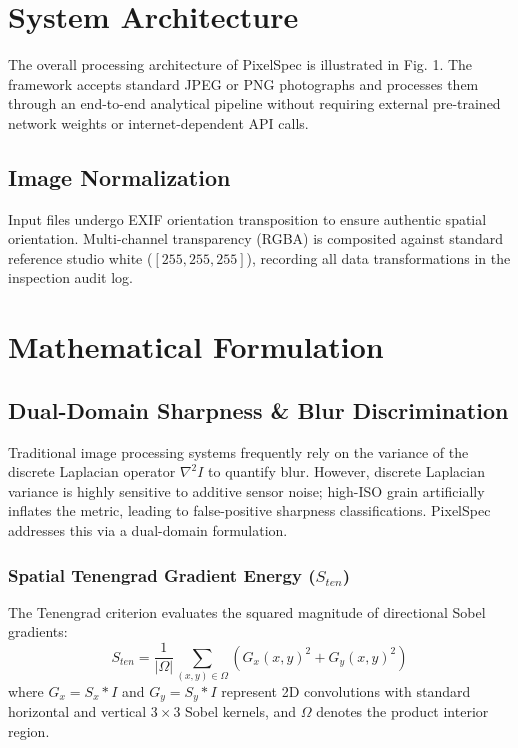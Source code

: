 \documentclass[conference]{IEEEtran}
\begin{document}
\section{System Architecture}
The overall processing architecture of PixelSpec is illustrated in Fig. 1. The framework accepts standard JPEG or PNG photographs and processes them through an end-to-end analytical pipeline without requiring external pre-trained network weights or internet-dependent API calls.

\subsection{Image Normalization}
Input files undergo EXIF orientation transposition to ensure authentic spatial orientation. Multi-channel transparency (RGBA) is composited against standard reference studio white ($[255, 255, 255]$), recording all data transformations in the inspection audit log.

\section{Mathematical Formulation}

\subsection{Dual-Domain Sharpness & Blur Discrimination}
Traditional image processing systems frequently rely on the variance of the discrete Laplacian operator $\nabla^2 I$ to quantify blur. However, discrete Laplacian variance is highly sensitive to additive sensor noise; high-ISO grain artificially inflates the metric, leading to false-positive sharpness classifications. PixelSpec addresses this via a dual-domain formulation.

\subsubsection{Spatial Tenengrad Gradient Energy ($S_{ten}$)}
The Tenengrad criterion evaluates the squared magnitude of directional Sobel gradients:
\begin{equation}
S_{ten} = \frac{1}{|\Omega|} \sum_{(x,y) \in \Omega} \left( G_x(x,y)^2 + G_y(x,y)^2 \right)
\end{equation}
where $G_x = S_x * I$ and $G_y = S_y * I$ represent 2D convolutions with standard horizontal and vertical $3 \times 3$ Sobel kernels, and $\Omega$ denotes the product interior region.
\end{document}
